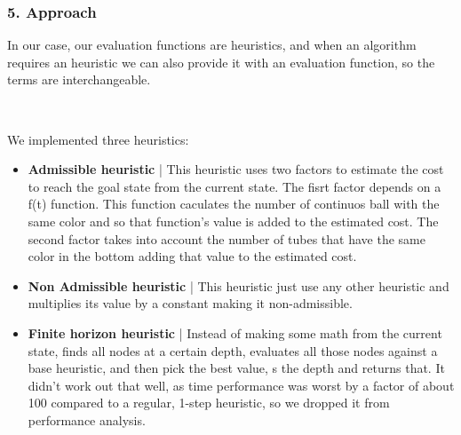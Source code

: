 \documentclass{beamer}
\begin{document}
\begin{frame}
  \frametitle{5. Approach}
  
  In our case, our evaluation functions are heuristics, and when an algorithm requires an heuristic we can also provide it with an evaluation function, so the terms are interchangeable.

  ~

  We implemented three heuristics:
  \begin{itemize}
    \item \textbf{Admissible heuristic} | This heuristic uses two factors to estimate the cost to reach the goal state from the current state. The fisrt factor depends on a f(t) function. This function caculates the number of continuos ball with the same color
    and so that function's value is added to the estimated cost. The second factor takes into account the number of tubes that have the same color in the bottom adding that value to the estimated cost.
    \item \textbf{Non Admissible heuristic} | This heuristic just use any other heuristic and multiplies its value by a constant making it non-admissible.
    \item \textbf{Finite horizon heuristic} | Instead of making some math from the current state, finds all nodes at a certain depth, evaluates all those nodes against a base heuristic, and then pick the best value, s the depth and returns that.
    It didn't work out that well, as time performance was worst by a factor of about 100 compared to a regular, 1-step heuristic, so we dropped it from performance analysis.
  \end{itemize}
\end{frame}
\end{document}
